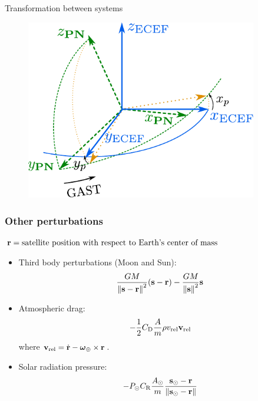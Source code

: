 \documentclass{beamer} %
\begin{document}
\begin{frame}{Transformation between systems}
\begin{figure}[htbp]
\begin{minipage}[ht]{0.3\textwidth}
    \end{minipage}
    \hspace{0.025\textwidth}
    \begin{minipage}[ht]{0.3\textwidth}
      \centering
      \includegraphics[width=0.9\textwidth]{../Images/polar_motion_matrix.pdf}
    \end{minipage}
  \end{figure}
\end{frame}
\begin{frame}
  \frametitle{Other perturbations}
  $\boldsymbol{\mathrm{r}} = \text{satellite position with respect to Earth's center of mass}$

  \vspace{0.25cm}
  \begin{itemize}
    \item<1-> Third body perturbations (Moon and Sun): $$\frac{GM}{\left\|\boldsymbol{\mathrm{s}}-\boldsymbol{\mathrm{r}}\right\|^2}(\boldsymbol{\mathrm{s}}-\boldsymbol{\mathrm{r}}) - \frac{GM}{\left\|\boldsymbol{\mathrm{s}}\right\|^2}\boldsymbol{\mathrm{s}}$$
    \item<2-> Atmospheric drag: $$-\frac{1}{2}C_\mathrm{D} \frac{A}{m}\rho v_\mathrm{rel}\boldsymbol{\mathrm{v}}_\mathrm{rel}$$
      where $\boldsymbol{\mathrm{v}}_\mathrm{rel}=\dot{\boldsymbol{\mathrm{r}}}-\boldsymbol{\mathrm{\omega}}_\oplus\times\boldsymbol{\mathrm{r}}$.
    \item<3-> Solar radiation pressure: $$
        -P_\odot C_\mathrm{R} \frac{A_\odot}{m} \frac{\boldsymbol{\mathrm{s}}_\odot-\boldsymbol{\mathrm{r}}}{\left\|\boldsymbol{\mathrm{s}}_\odot-\boldsymbol{\mathrm{r}}\right\|}
      $$
  \end{itemize}
\end{frame}
\end{document}
